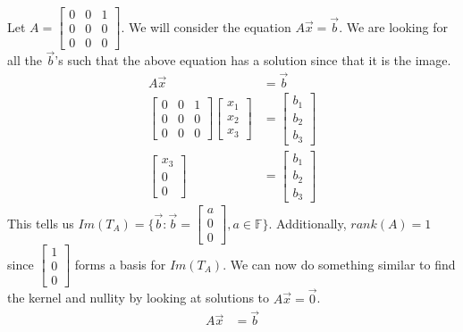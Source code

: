\begin{example}
    Let $A=\begin{bmatrix}
        0 & 0 & 1\\
        0 & 0 & 0\\
        0 & 0 & 0
    \end{bmatrix}$. We will consider the equation $A\vec{x}=\vec{b}$. We are looking for all the $\vec{b}$'s such that the above equation has a solution since that it is the image.
    \begin{align*}
        A\vec{x}&=\vec{b}\\
        \begin{bmatrix}
        0 & 0 & 1\\
        0 & 0 & 0\\
        0 & 0 & 0
    \end{bmatrix}\begin{bmatrix}
        x_1 \\ x_2 \\ x_3
    \end{bmatrix}&=\begin{bmatrix}
        b_1 \\ b_2 \\ b_3
    \end{bmatrix}\\
    \begin{bmatrix}
        x_3 \\ 0 \\ 0
    \end{bmatrix}&=\begin{bmatrix}
        b_1 \\ b_2 \\ b_3
    \end{bmatrix}
    \end{align*}
    This tells us $Im(T_A)=\{\vec{b}:\vec{b}=\begin{bmatrix}
        a \\ 0 \\ 0
    \end{bmatrix}, a\in\mathbb{F}\}$. Additionally, $rank(A)=1$ since $\begin{bmatrix}
        1 \\ 0 \\ 0
    \end{bmatrix}$ forms a basis for $Im(T_A)$. We can now do something similar to find the kernel and nullity by looking at solutions to $A\vec{x}=\vec{0}$.
    \begin{align*}
        A\vec{x}&=\vec{b}\\

\end{align*}
\end{example}
